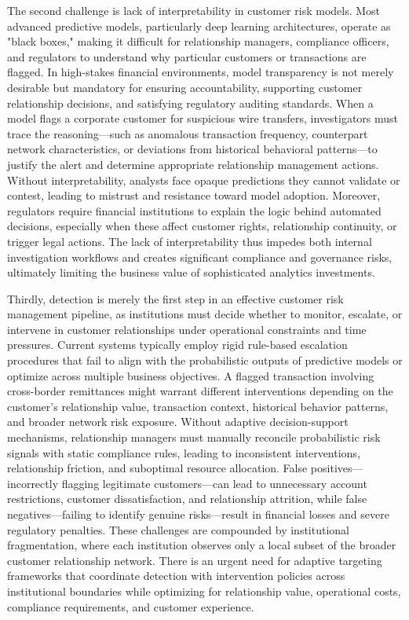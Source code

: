 The second challenge is lack of interpretability in customer risk models. Most advanced predictive models, particularly deep learning architectures, operate as "black boxes," making it difficult for relationship managers, compliance officers, and regulators to understand why particular customers or transactions are flagged. In high-stakes financial environments, model transparency is not merely desirable but mandatory for ensuring accountability, supporting customer relationship decisions, and satisfying regulatory auditing standards. When a model flags a corporate customer for suspicious wire transfers, investigators must trace the reasoning—such as anomalous transaction frequency, counterpart network characteristics, or deviations from historical behavioral patterns—to justify the alert and determine appropriate relationship management actions. Without interpretability, analysts face opaque predictions they cannot validate or contest, leading to mistrust and resistance toward model adoption. Moreover, regulators require financial institutions to explain the logic behind automated decisions, especially when these affect customer rights, relationship continuity, or trigger legal actions. The lack of interpretability thus impedes both internal investigation workflows and creates significant compliance and governance risks, ultimately limiting the business value of sophisticated analytics investments. 

Thirdly, detection is merely the first step in an effective customer risk management pipeline, as institutions must decide whether to monitor, escalate, or intervene in customer relationships under operational constraints and time pressures. Current systems typically employ rigid rule-based escalation procedures that fail to align with the probabilistic outputs of predictive models or optimize across multiple business objectives. A flagged transaction involving cross-border remittances might warrant different interventions depending on the customer's relationship value, transaction context, historical behavior patterns, and broader network risk exposure. Without adaptive decision-support mechanisms, relationship managers must manually reconcile probabilistic risk signals with static compliance rules, leading to inconsistent interventions, relationship friction, and suboptimal resource allocation. False positives—incorrectly flagging legitimate customers—can lead to unnecessary account restrictions, customer dissatisfaction, and relationship attrition, while false negatives—failing to identify genuine risks—result in financial losses and severe regulatory penalties. These challenges are compounded by institutional fragmentation, where each institution observes only a local subset of the broader customer relationship network. There is an urgent need for adaptive targeting frameworks that coordinate detection with intervention policies across institutional boundaries while optimizing for relationship value, operational costs, compliance requirements, and customer experience.

